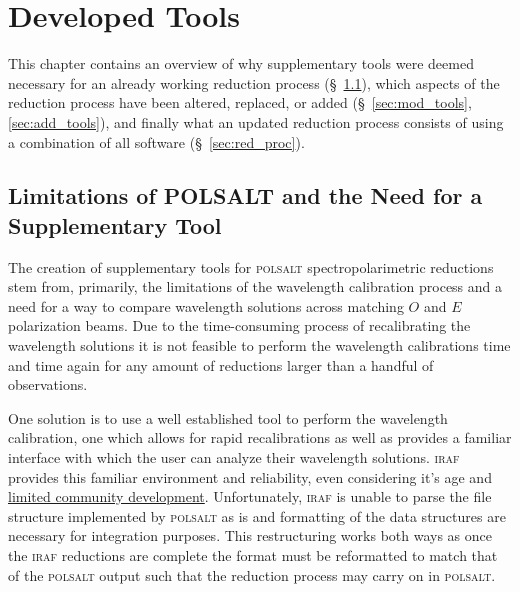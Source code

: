 \chapter{Developed Tools}

This chapter contains an overview of why supplementary tools were deemed necessary for an already working reduction process (\S~\ref{sec:polsalt_limits}), which aspects of the reduction process have been altered, replaced, or added (\S~\ref{sec:mod_tools}, \ref{sec:add_tools}), and finally what an updated reduction process consists of using a combination of all software (\S~\ref{sec:red_proc}).


\section{Limitations of POLSALT and the Need for a Supplementary Tool} \label{sec:polsalt_limits} %

The creation of supplementary tools for \textsc{polsalt} spectropolarimetric reductions stem from, primarily, the limitations of the wavelength calibration process and a need for a way to compare wavelength solutions across matching $O$ and $E$ polarization beams. Due to the time-consuming process of recalibrating the wavelength solutions it is not feasible to perform the wavelength calibrations time and time again for any amount of reductions larger than a handful of observations.
\prgph

One solution is to use a well established tool to perform the wavelength calibration, one which allows for rapid recalibrations as well as provides a familiar interface with which the user can analyze their wavelength solutions. \textsc{iraf} provides this familiar environment and reliability, even considering it's age and \hyperlink{https://github.com/iraf-community/iraf}{limited community development}. Unfortunately, \textsc{iraf} is unable to parse the file structure implemented by \textsc{polsalt} as is and formatting of the data structures are necessary for integration purposes. This restructuring works both ways as once the \textsc{iraf} reductions are complete the format must be reformatted to match that of the \textsc{polsalt} output such that the reduction process may carry on in \textsc{polsalt}.
\prgph



